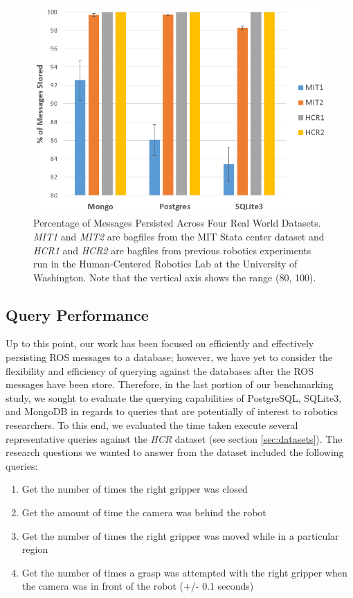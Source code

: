 \documentclass[nocopyrightspace]{acm_proc_article-sp}
\begin{document}
\begin{figure}
    \centering
    \includegraphics[width=\linewidth]{images/realworld}
    \caption{Percentage of Messages Persisted Across Four Real World Datasets. \textit{MIT1} and \textit{MIT2} are bagfiles from the MIT Stata center dataset and \textit{HCR1} and \textit{HCR2} are bagfiles from previous robotics experiments run in the Human-Centered Robotics Lab at the University of Washington. Note that the vertical axis shows the range (80, 100).}
    \label{fig:realworld}
\end{figure}

\subsection{Query Performance}
Up to this point, our work has been focused on efficiently and effectively persisting ROS messages to a database; however, we have yet to consider the flexibility and efficiency of querying against the databases after the ROS messages have been store. Therefore, in the last portion of our benchmarking study, we sought to evaluate the querying capabilities of PostgreSQL, SQLite3, and MongoDB in regards to queries that are potentially of interest to robotics researchers. To this end, we evaluated the time taken execute several representative queries against the \textit{HCR} dataset (see section \ref{sec:datasets}). The research questions we wanted to answer from the dataset included the following queries:

\begin{enumerate}[label=Q\arabic*]
    \item Get the number of times the right gripper was closed
    \item Get the amount of time the camera was behind the robot
    \item Get the number of times the right gripper was moved while in a particular region
    \item Get the number of times a grasp was attempted with the right gripper when the camera was in front of the robot (+/- 0.1 seconds)
\end{enumerate}
\end{document}
